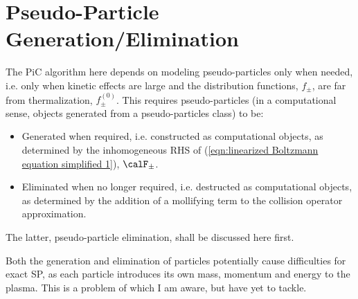 \section{Pseudo-Particle Generation/Elimination}\label{cha:particle generation}
    The PiC algorithm here depends on modeling pseudo-particles only when needed, i.e. only when kinetic effects are large and the distribution functions, $f_{\pm}$, are far from thermalization, $f_{\pm}^{(0)}$. This requires pseudo-particles (in a computational sense, objects generated from a pseudo-particles class) to be:
    \begin{itemize}
        \item  Generated when required, i.e. constructed as computational objects, as determined by the inhomogeneous RHS of (\ref{eqn:linearized Boltzmann equation simplified 1}), $\calF_{\pm}$.
        \item  Eliminated when no longer required, i.e. destructed as computational objects, as determined by the addition of a mollifying term to the collision operator approximation.
    \end{itemize}
    The latter, pseudo-particle elimination, shall be discussed here first.

    \begin{remark}
        Both the generation and elimination of particles potentially cause difficulties for exact SP, as each particle introduces its own mass, momentum and energy to the plasma. This is a problem of which I am aware, but have yet to tackle.
    \end{remark}
    
    
    
    
    